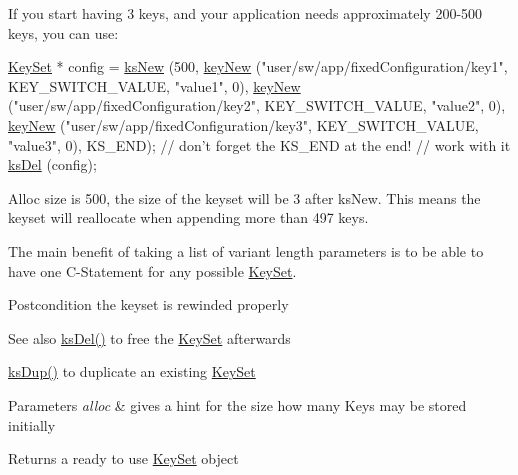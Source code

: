If you start having 3 keys, and your application needs approximately 200-\/500 keys, you can use\+: 
\begin{DoxyCode}
\hyperlink{classkdb_1_1KeySet_a4eac9850fa4f06c07a5306befc3e4377}{KeySet} * config = \hyperlink{group__keyset_ga671e1aaee3ae9dc13b4834a4ddbd2c3c}{ksNew} (500,
        \hyperlink{group__key_gad23c65b44bf48d773759e1f9a4d43b89}{keyNew} (\textcolor{stringliteral}{"user/sw/app/fixedConfiguration/key1"}, KEY\_SWITCH\_VALUE, \textcolor{stringliteral}{"value1"}, 0),
        \hyperlink{group__key_gad23c65b44bf48d773759e1f9a4d43b89}{keyNew} (\textcolor{stringliteral}{"user/sw/app/fixedConfiguration/key2"}, KEY\_SWITCH\_VALUE, \textcolor{stringliteral}{"value2"}, 0),
        \hyperlink{group__key_gad23c65b44bf48d773759e1f9a4d43b89}{keyNew} (\textcolor{stringliteral}{"user/sw/app/fixedConfiguration/key3"}, KEY\_SWITCH\_VALUE, \textcolor{stringliteral}{"value3"}, 0),
        KS\_END); \textcolor{comment}{// don't forget the KS\_END at the end!}
\textcolor{comment}{// work with it}
\hyperlink{group__keyset_ga27e5c16473b02a422238c8d970db7ac8}{ksDel} (config);
\end{DoxyCode}
 Alloc size is 500, the size of the keyset will be 3 after ks\+New. This means the keyset will reallocate when appending more than 497 keys.

The main benefit of taking a list of variant length parameters is to be able to have one C-\/\+Statement for any possible \hyperlink{classkdb_1_1KeySet}{Key\+Set}.

\begin{DoxyPostcond}{Postcondition}
the keyset is rewinded properly
\end{DoxyPostcond}
\begin{DoxySeeAlso}{See also}
\hyperlink{group__keyset_ga27e5c16473b02a422238c8d970db7ac8}{ks\+Del()} to free the \hyperlink{group__keyset}{Key\+Set} afterwards 

\hyperlink{group__keyset_gac59e4b328245463f1451f68d5106151c}{ks\+Dup()} to duplicate an existing \hyperlink{group__keyset}{Key\+Set} 
\end{DoxySeeAlso}

\begin{DoxyParams}{Parameters}
{\em alloc} & gives a hint for the size how many Keys may be stored initially \\
\hline
\end{DoxyParams}
\begin{DoxyReturn}{Returns}
a ready to use \hyperlink{classkdb_1_1KeySet}{Key\+Set} object 
\end{DoxyReturn}

